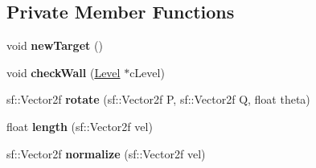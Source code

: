 \subsection*{Private Member Functions}
\begin{DoxyCompactItemize}
\item 
\mbox{\label{class_worker_a93dac33d94587b0b9448daf414be8a3f}} 
void {\bfseries new\+Target} ()
\item 
\mbox{\label{class_worker_a83dee6dec3f7582f360b5d4bc9de77b0}} 
void {\bfseries check\+Wall} (\mbox{\hyperlink{class_level}{Level}} $\ast$c\+Level)
\item 
\mbox{\label{class_worker_ab86300a949fcc3177c0d011b61fc2e93}} 
sf\+::\+Vector2f {\bfseries rotate} (sf\+::\+Vector2f P, sf\+::\+Vector2f Q, float theta)
\item 
\mbox{\label{class_worker_ad9fe38db620d1d56108976544714a7cd}} 
float {\bfseries length} (sf\+::\+Vector2f vel)
\item 
\mbox{\label{class_worker_aaa104317266247a5eb37ca4fbd7a24b2}} 
sf\+::\+Vector2f {\bfseries normalize} (sf\+::\+Vector2f vel)
\end{DoxyCompactItemize}
